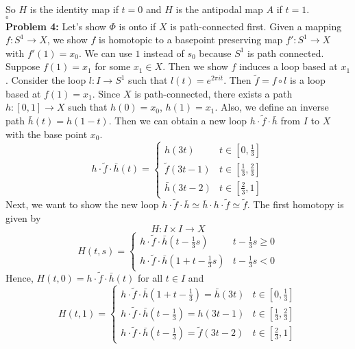 \documentclass[12pt]{amsart}
\begin{document}
So $H$ is the identity map if $t=0$ and $H$ is the antipodal map $A$ if $t=1$.
\\\phantom{qed}\hfill$\square$\\
\textbf{Problem 4:}
Let's show $\Phi$ is onto if $X$ is path-connected first.
Given a mapping $f: S^1 \rightarrow X$, we show $f$ is homotopic to a basepoint preserving map $f':S^1\rightarrow X$ with $f'(1)=x_0$. We can use $1$ instead of $s_0$ because $S^1$ is path connected. Suppose $f(1)=x_1$ for some $x_1\in X$. Then we show $f$ induces a loop based at $x_1$. Consider the loop $l:I \rightarrow S^1$ such that $l(t)=e^{2\pi it}$. Then $\tilde{f}=f\circ l$ is a loop based at $f(1)=x_1$. Since $X$ is path-connected, there exists a path $h:[0,1]\rightarrow X$ such that $h(0)=x_0$, $h(1)=x_1$. Also, we define an inverse path $\bar{h}(t)=h(1-t)$. Then we can obtain a new loop $ h\cdot \tilde{f}\cdot \bar{h}$ from $I$ to $X$ with the base point $x_0$.
\[h\cdot \tilde{f}\cdot \bar{h}(t)=\begin{cases}
        h(3t)           & t\in [0,\frac{1}{3}]           \\
        \tilde{f}(3t-1) & t\in [\frac{1}{3},\frac{2}{3}] \\
        \bar{h}(3t-2)   & t\in [\frac{2}{3},1]
    \end{cases}\]Next, we want to show the new loop $h\cdot \tilde{f}\cdot \bar{h}\simeq \bar{h}\cdot h\cdot \tilde{f}\simeq \tilde{f}$. The first homotopy is given by
\[H:I\times I \rightarrow X \]
\[H(t,s)=\begin{cases}
        h\cdot \tilde{f}\cdot \bar{h}(t-\frac{1}{3}s)   & t-\frac{1}{3}s\geq 0 \\
        h\cdot \tilde{f}\cdot \bar{h}(1+t-\frac{1}{3}s) & t-\frac{1}{3}s<0
    \end{cases}
\]
Hence, $H(t,0)=h\cdot \tilde{f}\cdot \bar{h}(t)$ for all $t\in I$ and
\[H(t,1)=\begin{cases}
        h\cdot \tilde{f}\cdot \bar{h}(1+t-\frac{1}{3})= \bar{h}(3t)  & t\in[0,\frac{1}{3}]            \\
        h\cdot \tilde{f}\cdot \bar{h}(t-\frac{1}{3})=h(3t-1)         & t\in [\frac{1}{3},\frac{2}{3}] \\
        h\cdot \tilde{f}\cdot \bar{h}(t-\frac{1}{3})=\tilde{f}(3t-2) & t\in [\frac{2}{3},1]
    \end{cases}\]
\end{document}
